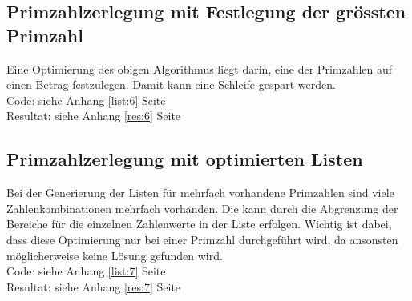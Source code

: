 \documentclass[a4paper, 10pt, fleqn]{article}
\begin{document}
\subsection{Primzahlzerlegung mit Festlegung der grössten Primzahl}
\label{sec:6}
Eine Optimierung des obigen Algorithmus liegt darin, eine der Primzahlen auf 
einen Betrag festzulegen. Damit kann eine Schleife gespart werden. \\
Code: siehe Anhang \ref{list:6} Seite \pageref{list:6} \\
Resultat: siehe Anhang \ref{res:6} Seite \pageref{res:6} 
% 

\subsection{Primzahlzerlegung mit optimierten Listen}
\label{sec:7}
Bei der Generierung der Listen für mehrfach vorhandene Primzahlen sind viele 
Zahlenkombinationen mehrfach vorhanden. Die kann durch die Abgrenzung der 
Bereiche für die einzelnen Zahlenwerte in der Liste erfolgen. Wichtig ist 
dabei, dass diese Optimierung nur bei einer Primzahl durchgeführt wird, da 
ansonsten möglicherweise keine Lösung gefunden wird. \\
Code: siehe Anhang \ref{list:7} Seite \pageref{list:7} \\
Resultat: siehe Anhang \ref{res:7} Seite \pageref{res:7} 
% 
\end{document}

